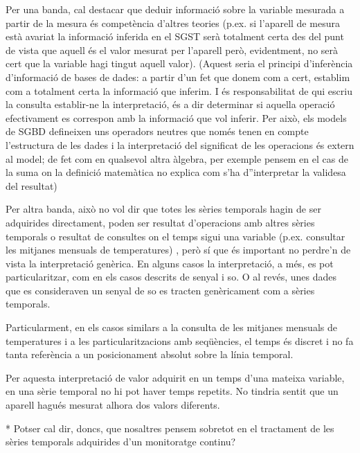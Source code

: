   Per una banda, cal destacar que deduir informació sobre la variable
  mesurada a partir de la mesura és competència d'altres teories
  (p.ex. si l'aparell de mesura està avariat la informació inferida en
  el SGST serà totalment certa des del punt de vista que aquell és el
  valor mesurat per l'aparell però, evidentment, no serà cert que la
  variable hagi tingut aquell valor). (Aquest seria el principi
  d'inferència d'informació de bases de dades: a partir d'un fet que
  donem com a cert, establim com a totalment certa la informació que
  inferim. I és responsabilitat de qui escriu la consulta establir-ne
  la interpretació, és a dir determinar si aquella operació
  efectivament es correspon amb la informació que vol inferir. Per
  això, els models de SGBD defineixen uns operadors neutres que només
  tenen en compte l'estructura de les dades i la interpretació del
  significat de les operacions és extern al model; de fet com en
  qualsevol altra àlgebra, per exemple pensem en el cas de la suma on
  la definició matemàtica no explica com s'ha d''interpretar la
  validesa del resultat)

  Per altra banda, això no vol dir que totes les sèries temporals hagin de
  ser adquirides directament, poden ser resultat d'operacions amb
  altres sèries temporals o resultat de consultes on el temps sigui
  una variable (p.ex. consultar les mitjanes mensuals de temperatures)
 , però sí
  que és important no perdre'n de vista la interpretació genèrica. En
  alguns casos la interpretació, a més, es pot particularitzar, com en
  els casos descrits de senyal i so. O al revés, unes dades que es
  consideraven un senyal de so es tracten genèricament com a sèries
  temporals.

  Particularment, en els casos similars a la consulta de les mitjanes
  mensuals de temperatures i a les particularitzacions amb seqüències,
  el temps és discret i no fa tanta referència a un posicionament
  absolut sobre la línia temporal.


Per aquesta interpretació de valor adquirit en un temps d'una mateixa variable, en una sèrie temporal no hi pot haver temps repetits. No tindria sentit que un aparell hagués mesurat alhora dos valors diferents.
  


* Potser cal dir, doncs, que nosaltres pensem sobretot en el tractament de les sèries temporals adquirides d'un monitoratge continu?





